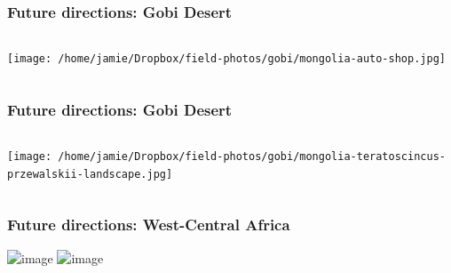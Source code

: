 \begin{frame}
    \frametitle{Future directions: Gobi Desert}
    \vspace{-2mm}
    \begin{columns}
        \column{\dimexpr\paperwidth}
        \texttt{[image: /home/jamie/Dropbox/field-photos/gobi/mongolia-auto-shop.jpg]}
    \end{columns}
\end{frame}

\begin{frame}
    \frametitle{Future directions: Gobi Desert}
    \vspace{-2mm}
    \begin{columns}
        \column{\dimexpr\paperwidth}
        \texttt{[image: /home/jamie/Dropbox/field-photos/gobi/mongolia-teratoscincus-przewalskii-landscape.jpg]}
    \end{columns}
\end{frame}

\begin{frame}[t]
    \frametitle{Future directions: West-Central Africa}
    \begin{center}
        \includegraphics<1->[height={3cm}]{/home/jamie/Dropbox/field-photos/africa/Figure2_WAmapForestDist.png}
        \hspace{0.3mm}
        \includegraphics<1->[height={3cm}]{/home/jamie/Dropbox/field-photos/africa/Figure4_herps.jpeg}
    \end{center}


\end{frame}


